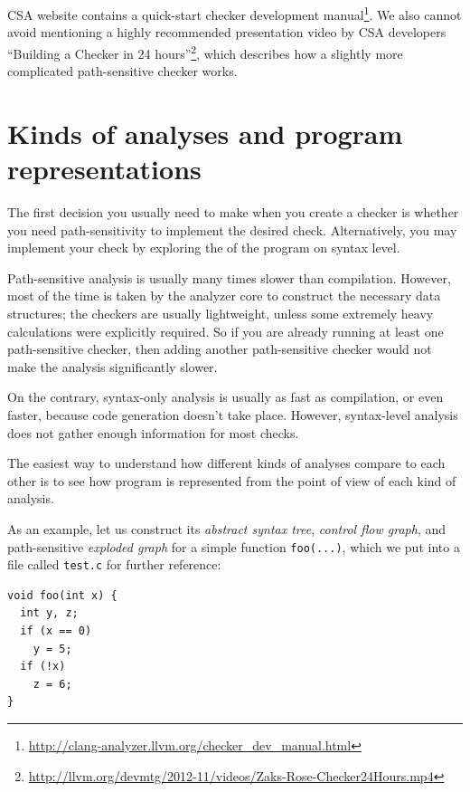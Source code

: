 \documentclass[a4paper,12pt]{article}
\newenvironment{nobr}{\begin{minipage}{\textwidth}\setlength\parskip{1em}
}{\end{minipage}\ignorespacesafterend}
\begin{document}
CSA website contains a quick-start checker development manual\footnote{\url{http://clang-analyzer.llvm.org/checker_dev_manual.html}}. We also cannot avoid mentioning a highly recommended presentation video by CSA developers ``Building a Checker in 24 hours''\footnote{\url{http://llvm.org/devmtg/2012-11/videos/Zaks-Rose-Checker24Hours.mp4}}, which describes how a slightly more complicated path-sensitive checker works.

\newpage
\section{Kinds of analyses and program representations}\label{sec:data_structures}

The first decision you usually need to make when you create a checker is whether you need path-sensitivity to implement the desired check. Alternatively, you may implement your check by exploring the of the program on syntax level.

Path-sensitive analysis is usually many times slower than compilation. However, most of the time is taken by the analyzer core to construct the necessary data structures; the checkers are usually lightweight, unless some extremely heavy calculations were explicitly required. So if you are already running at least one path-sensitive checker, then adding another path-sensitive checker would not make the analysis significantly slower.

On the contrary, syntax-only analysis is usually as fast as compilation, or even faster, because code generation doesn't take place. However, syntax-level analysis does not gather enough information for most checks.

The easiest way to understand how different kinds of analyses compare to each other is to see how program is represented from the point of view of each kind of analysis.

\begin{nobr}
As an example, let us construct its \emph{abstract syntax tree}, \emph{control flow graph}, and path-sensitive \emph{exploded graph} for a simple function \lstinline|foo(...)|, which we put into a file called \lstinline|test.c| for further reference:

\begin{lstlisting}[style=cplusplus,title=\lstinline|test.c|]
void foo(int x) {
  int y, z;
  if (x == 0)
    y = 5;
  if (!x)
    z = 6;
}
\end{lstlisting}
\end{nobr}
\end{document}

